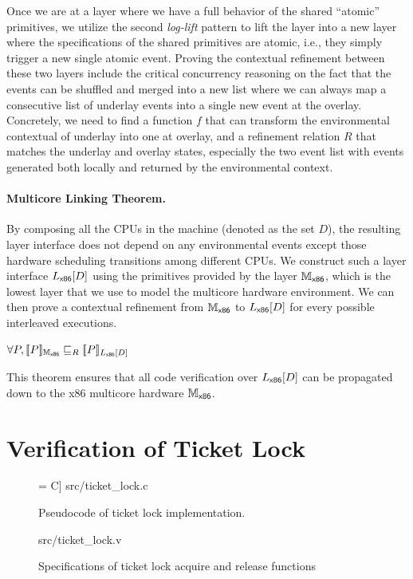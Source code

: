 Once we are at a layer where we have a full behavior of the shared
``atomic'' primitives, we utilize the second \emph{log-lift} pattern to
lift the layer into a new layer where the specifications of the shared
primitives are atomic, i.e., they simply trigger a new single atomic
event. Proving the contextual refinement between these two layers include
the critical concurrency reasoning on the fact that the events can be
shuffled and merged into a new list where we can always map a consecutive
list of underlay events into a single new event at the overlay.
Concretely, we need to find a function $f$ that can transform the environmental
contextual of underlay into one at overlay, and a refinement relation $R$
that matches the underlay and overlay states, especially the two event list
with events generated both locally and returned by the environmental context.

\paragraph{Multicore Linking Theorem.}
By composing all the CPUs in the machine (denoted as the set $D$), the resulting 
layer interface does not depend on any environmental events except those
hardware scheduling transitions among different CPUs.
We construct such a layer interface $\PBoot[D]$
using the primitives provided by the layer $\Mach_{\boot}$, which is the lowest
layer that we use to model the multicore hardware environment. 
We can then prove a contextual refinement from  $\Mach_{\boot}$ to $\PBoot[D]$
for every possible interleaved executions.
\begin{theorem}
\label{thm:link}
$\forall P, \sem{\Mach_{\boot}}{P} \refines_R \sem{\PBoot[D]}{P}$
\end{theorem}
This theorem ensures that all code verification over $\PBoot[D]$ can be propagated down to the x86 multicore hardware 
$\Mach_{\boot}$.


\section{Verification of Ticket Lock}
\label{veri-ticket-lock}

\begin{figure}[t]
 = C] {src/ticket_lock.c}
\caption{Pseudocode of ticket lock implementation.}
\label{fig:ticket_lock_c}
\end{figure}

\begin{figure}
	 {src/ticket_lock.v}
	\caption{Specifications of ticket lock acquire and release functions}
	\label{fig:ticket_lock_v}
\end{figure}

